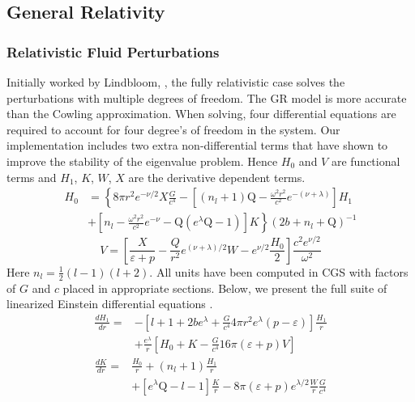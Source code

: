 \documentclass[aps,prd,twocolumn,superscriptaddress,footinbib]{revtex4-1}
\begin{document}
\subsection{General Relativity}
\subsubsection{Relativistic Fluid Perturbations}
Initially worked by Lindbloom, \cite{lindblom1983quadrupole, 2204, 2205}, the fully relativistic case solves the perturbations with multiple degrees of freedom. The GR model is more accurate than the Cowling approximation. When solving, four differential equations are required to account for four degree's of freedom in the system. Our implementation includes two extra non-differential terms that have shown to improve the stability of the eigenvalue problem. Hence $H_0$ and $V$ are functional terms and $H_1$, $K$, $W$, $X$ are the derivative dependent terms.
\begin{equation}
\begin{aligned}
H_{0} &=\left\{8 \pi r^{2} e^{-\nu / 2} X \frac{G}{c^4} -\left[\left(n_{l}+1\right) \mathrm{Q}-\frac{\omega^{2} r^{2}}{c^2} e^{-(\nu+\lambda)}\right] H_{1}\right.\\
&\left.+\left[n_{l}-\frac{\omega^{2} r^{2}}{c^2} e^{-\nu}-\mathrm{Q}\left(e^{\lambda} \mathrm{Q}-1\right)\right] K\right\}\left(2 b+n_{l}+\mathrm{Q}\right)^{-1}
\end{aligned}
\end{equation}
\begin{equation}
V=\left[\frac{X}{\varepsilon+p}-\frac{Q}{r^{2}} e^{(\nu+\lambda) / 2} W-e^{\nu / 2} \frac{H_{0}}{2}\right] \frac{c^2 e^{\nu / 2}}{\omega^{2}}
\end{equation}
Here $n_l = \frac{1}{2}\left(l-1\right)\left(l+2\right)$. All units have been computed in CGS with factors of $G$ and $c$ placed in appropriate sections. Below, we present the full suite of linearized Einstein differential equations \cite{lindblom1983quadrupole, 1985, 2204}. 
\begin{equation}
\begin{aligned}
\frac{d H_{1}}{d r}=&-\left[l+1+2 b e^{\lambda}+ \frac{G}{c^4} 4 \pi r^{2} e^{\lambda}(p-\varepsilon)\right] \frac{H_{1}}{r} \\
&+\frac{e^{\lambda}}{r}\left[H_{0}+K-\frac{G}{c^4}16 \pi(\varepsilon+p) V\right]
\end{aligned}
\end{equation}
\begin{equation}
\begin{aligned}
\frac{d K}{d r}=& \frac{H_{0}}{r}+\left(n_{l}+1\right) \frac{H_{1}}{r} \\
&+\left[e^{\lambda} \mathrm{Q}-l-1\right] \frac{K}{r}-8 \pi(\varepsilon+p) e^{\lambda / 2} \frac{W}{r}\frac{G}{c^4}
\end{aligned}
\end{equation}
\end{document}
